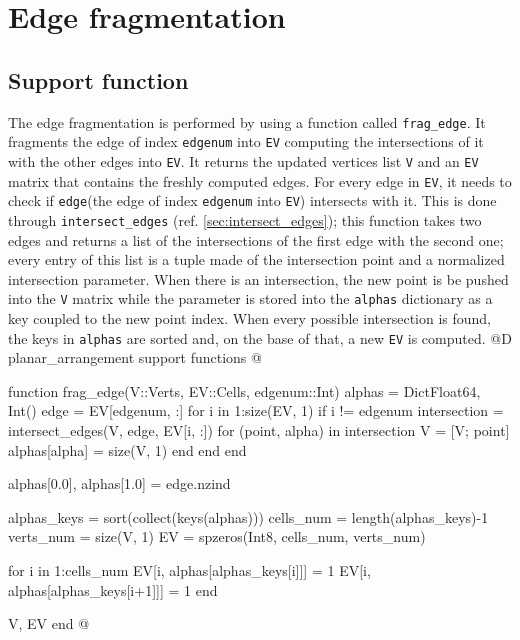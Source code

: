 \documentclass[10pt]{book}
\begin{document}
\section{Edge fragmentation}
\subsection{Support function}
\label{sec:frag_edge}
The edge fragmentation is performed by using a function called \texttt{frag\_edge}.
It fragments the edge of index \texttt{edgenum} into \texttt{EV} computing the intersections of
it with the other edges into \texttt{EV}. It returns the updated vertices list \texttt{V} and an 
\texttt{EV} matrix that contains the freshly computed edges.
For every edge in \texttt{EV}, it needs to check if \texttt{edge}(the edge of index \texttt{edgenum} into 
\texttt{EV}) intersects with it. This is done through \texttt{intersect\_edges} (ref. \ref{sec:intersect_edges}); 
this function takes two edges and returns a list of the intersections of the first edge with the second one; 
every entry of this list is a tuple made of the intersection point and a normalized intersection parameter. 
When there is an intersection, the new point is be pushed into the \texttt{V} matrix while the parameter 
is stored into the \texttt{alphas} dictionary as a key coupled to the new point index.
When every possible intersection is found, the keys in \texttt{alphas} are sorted and, on the base of that,
a new \texttt{EV} is computed.
@D planar\_arrangement support functions
@{function frag_edge(V::Verts, EV::Cells, edgenum::Int)
    alphas = Dict{Float64, Int}()
    edge = EV[edgenum, :]
    for i in 1:size(EV, 1)
        if i != edgenum
            intersection = intersect_edges(V, edge, EV[i, :])
            for (point, alpha) in intersection
                V = [V; point]
                alphas[alpha] = size(V, 1)
            end
        end
    end

    alphas[0.0], alphas[1.0] = edge.nzind

    alphas_keys = sort(collect(keys(alphas)))
    cells_num = length(alphas_keys)-1
    verts_num = size(V, 1)
    EV = spzeros(Int8, cells_num, verts_num)

    for i in 1:cells_num
        EV[i, alphas[alphas_keys[i]]] = 1
        EV[i, alphas[alphas_keys[i+1]]] = 1
    end

    V, EV
end
@}
\end{document}
